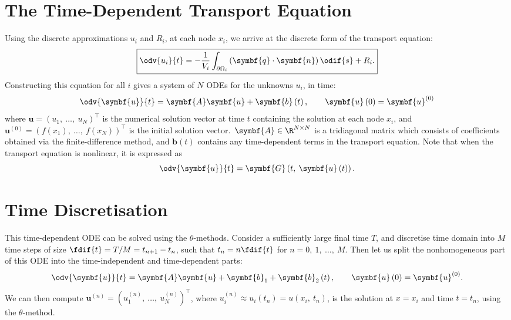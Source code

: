 \documentclass{article}
\begin{document}
\section{The Time-Dependent Transport Equation}
Using the discrete approximations \(u_i\) and \(R_i\), at each node
\(x_i\), we arrive at the discrete form of the transport equation:
\begin{equation}
    \boxed{
        \odv{u_i}{t} = - \frac{1}{V_i} \int_{\partial \Omega_i} \left( \symbf{q} \cdot \symbf{n} \right) \odif{s} + R_i.
    }
\end{equation}
Constructing this equation for all \(i\) gives a system of \(N\) ODEs
for the unknowns \(u_i\), in time:
\begin{equation*}
    \odv{\symbf{u}}{t} = \symbf{A} \symbf{u} + \symbf{b}\left( t \right), \qquad \symbf{u}\left( 0 \right) = \symbf{u}^{\left( 0 \right)}
\end{equation*}
where \(\symbf{u} = {\left( u_1,\: \dots,\: u_N \right)}^\top\) is the
numerical solution vector at time \(t\) containing the solution at each
node \(x_i\), and
\(\symbf{u}^{\left( 0 \right)} = {\left( f\left( x_1 \right),\: \dots,\: f\left( x_N \right) \right)}^\top\)
is the initial solution vector.\ \(\symbf{A} \in \R^{N \times N}\) is a
tridiagonal matrix which consists of coefficients obtained via the
finite-difference method, and \(\symbf{b}\left( t \right)\) contains any
time-dependent terms in the transport equation. Note that when the
transport equation is nonlinear, it is expressed as
\begin{equation*}
    \odv{\symbf{u}}{t} = \symbf{G}\left( t,\: \symbf{u}\left( t \right) \right).
\end{equation*}
\section{Time Discretisation}
This time-dependent ODE can be solved using the \(\theta\)-methods.
Consider a sufficiently large final time \(T\), and discretise time
domain into \(M\) time steps of size \(\fdif{t} = T/M = t_{n+1} -
t_n\), such that \(t_n = n \fdif{t}\) for \(n = 0,\: 1,\: \ldots,\:
M\). Then let us split the nonhomogeneous part of this ODE into the
time-independent and time-dependent parts:
\begin{equation*}
    \odv{\symbf{u}}{t} = \symbf{A} \symbf{u} + \symbf{b}_1 + \symbf{b}_2\left( t \right), \qquad \symbf{u}\left( 0 \right) = \symbf{u}^{\left( 0 \right)}.
\end{equation*}
We can then compute \(\symbf{u}^{\left( n \right)} = {\left( u_1^{\left( n \right)},\: \dots,\: u_N^{\left( n \right)} \right)}^\top\),
where \(u_i^{\left( n \right)} \approx u_i\left( t_n \right) = u\left( x_i,\: t_n \right)\),
is the solution at \(x = x_i\) and time \(t = t_n\), using the \(\theta\)-method.
\end{document}
